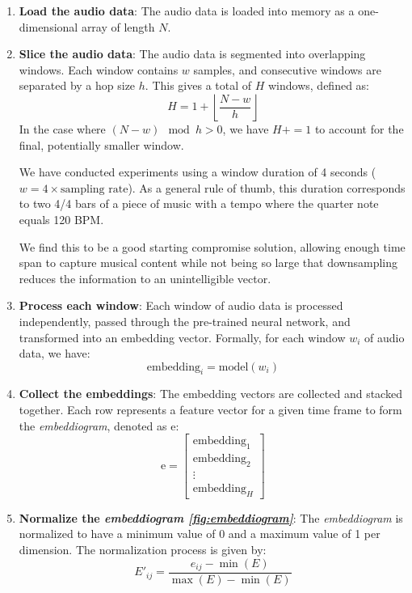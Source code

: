 \begin{enumerate}
\item \textbf{Load the audio data}: The audio data is loaded into memory as a one-dimensional array of length $N$.

\item \textbf{Slice the audio data}: The audio data is segmented into overlapping windows. Each window contains $w$ samples, and consecutive windows are separated by a hop size $h$. This gives a total of $H$ windows, defined as:
\begin{equation}
H = 1 + \left\lfloor \frac{N - w}{h} \right\rfloor
\end{equation}
In the case where $\left( N - w \right) \mod h > 0$, we have $H += 1$ to account for the final, potentially smaller window.

We have conducted experiments using a window duration of 4 seconds (\(w = 4 \times \text{{sampling rate}}\)). As a general rule of thumb, this duration corresponds to two 4/4 bars of a piece of music with a tempo where the quarter note equals 120 BPM.

We find this to be a good starting compromise solution, allowing enough time span to capture musical content while not being so large that downsampling reduces the information to an unintelligible vector.

\item \textbf{Process each window}: Each window of audio data is processed independently, passed through the pre-trained neural network, and transformed into an embedding vector. Formally, for each window $w_i$ of audio data, we have:
\begin{equation}
\text{embedding}_i = \text{model}(w_i)
\end{equation}

\item \textbf{Collect the embeddings}: The embedding vectors are collected and stacked together. Each row represents a feature vector for a given time frame to form the \textit{embeddiogram}, denoted as $\text{e}$:
\begin{equation}
\text{e} = \begin{bmatrix} \text{embedding}_1 \\ \text{embedding}_2 \\ \vdots \\ \text{embedding}_H \end{bmatrix}
\end{equation}

\item \textbf{Normalize the \textit{embeddiogram \ref{fig:embeddiogram}}}: The \textit{embeddiogram} is normalized to have a minimum value of 0 and a maximum value of 1 per dimension. The normalization process is given by:
\begin{equation}
E'_{ij} = \frac{e_{ij} - \min(E)}{\max(E) - \min(E)}
\end{equation}
\end{enumerate}

